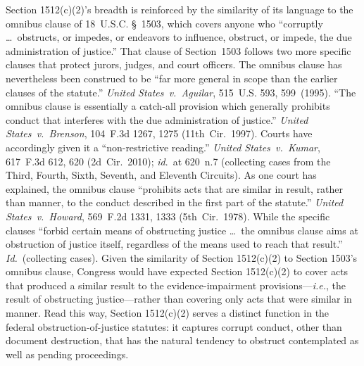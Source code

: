 Section 1512(c)(2)'s breadth is reinforced by the similarity of its language to the omnibus clause of 18~U.S.C. \S~1503, which covers anyone who ``corruptly \dots\ obstructs, or impedes, or endeavors to influence, obstruct, or impede, the due administration of justice.'' That clause of Section~1503 follows two more specific clauses that protect jurors, judges, and court officers.
The omnibus clause has nevertheless been construed to be ``far more general in scope than the earlier clauses of the statute.''
\textit{United States~v.\ Aguilar}, 515~U.S. 593, 599~(1995).
``The omnibus clause is essentially a catch-all provision which generally prohibits conduct that interferes with the due administration of justice.''
\textit{United States~v.\ Brenson}, 104~F.3d 1267, 1275 (11th~Cir.~1997).
Courts have accordingly given it a ``non-restrictive reading.''
\textit{United States~v.\ Kumar}, 617~F.3d 612, 620 (2d~Cir.~2010); \textit{id}.~at 620~n.7 (collecting cases from the Third, Fourth, Sixth, Seventh, and Eleventh Circuits).
As one court has explained, the omnibus clause ``prohibits acts that are similar in result, rather than manner, to the conduct described in the first part of the statute.''
\textit{United States~v.\ Howard}, 569~F.2d 1331, 1333 (5th~Cir.~1978).
While the specific clauses ``forbid certain means of obstructing justice \dots\ the omnibus clause aims at obstruction of justice itself, regardless of the means used to reach that result.''
\textit{Id.}~(collecting cases).
Given the similarity of Section 1512(c)(2) to Section 1503's omnibus clause, Congress would have expected Section 1512(c)(2) to cover acts that produced a similar result to the evidence-impairment provisions---\textit{i.e.}, the result of obstructing justice---rather than covering only acts that were similar in manner.
Read this way, Section 1512(c)(2) serves a distinct function in the federal obstruction-of-justice statutes: it captures corrupt conduct, other than document destruction, that has the natural tendency to obstruct contemplated as well as pending proceedings.

